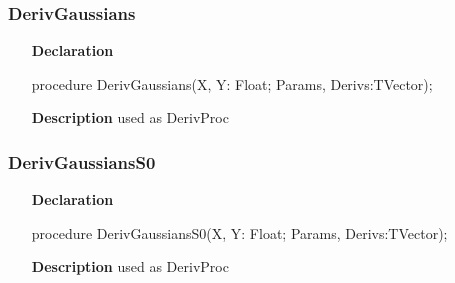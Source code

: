 \documentclass[12pt,a4paper,oneside]{report}
\newcommand{\declarationitem}[1]{\textbf{#1}}
\newcommand{\descriptiontitle}[1]{\textbf{#1}}
\begin{document}
\subsubsection{DerivGaussians}
\label{ugauss-DerivGaussians}
\begin{itemize}\item[\declarationitem{Declaration}\hfill]
	\begin{flushleft}
		\begin{ttfamily}
			procedure DerivGaussians(X, Y: Float; Params, Derivs:TVector);\end{ttfamily}
		
	\end{flushleft}
	
	\par
	\item[\descriptiontitle{Description}]
	used as DerivProc
	
\end{itemize}
\subsubsection{DerivGaussiansS0}
\label{ugauss-DerivGaussiansS0}
\begin{itemize}\item[\declarationitem{Declaration}\hfill]
	\begin{flushleft}
		\begin{ttfamily}
			procedure DerivGaussiansS0(X, Y: Float; Params, Derivs:TVector);\end{ttfamily}
		
	\end{flushleft}
	
	\par
	\item[\descriptiontitle{Description}]
	used as DerivProc
	
\end{itemize}
\end{document}
